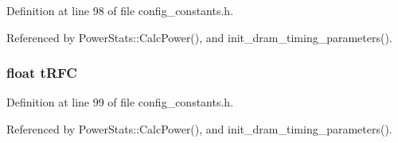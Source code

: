 Definition at line 98 of file config\_\-constants.h.

Referenced by PowerStats::CalcPower(), and init\_\-dram\_\-timing\_\-parameters().
\subsubsection[{tRFC}]{\setlength{\rightskip}{0pt plus 5cm}float {\bf tRFC}}\label{mc__constants_8h_e3d6088ef7cf719532282882b62a3afc}




Definition at line 99 of file config\_\-constants.h.

Referenced by PowerStats::CalcPower(), and init\_\-dram\_\-timing\_\-parameters().